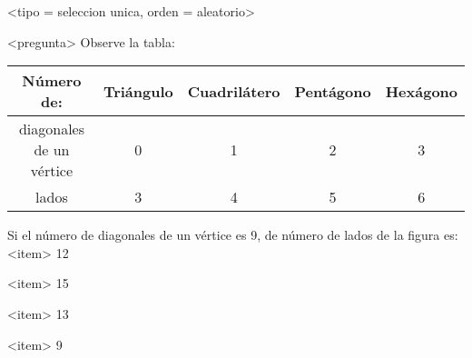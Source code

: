 <tipo = seleccion unica, orden = aleatorio>

<pregunta>
Observe la tabla:
\begin{center}
\begin{tabular}{ccccc} \toprule
Número de: & Triángulo & Cuadrilátero & Pentágono & Hexágono \\ \midrule
diagonales de un vértice & 0 & 1 & 2 & 3 \\
lados & 3  & 4 & 5 & 6 \\ \bottomrule
\end{tabular}
\end{center}
Si el número de diagonales de un vértice es 9, de número de lados de la figura es: \\[1ex]

<item>
12

<item>
15

<item>
13

<item>
9

